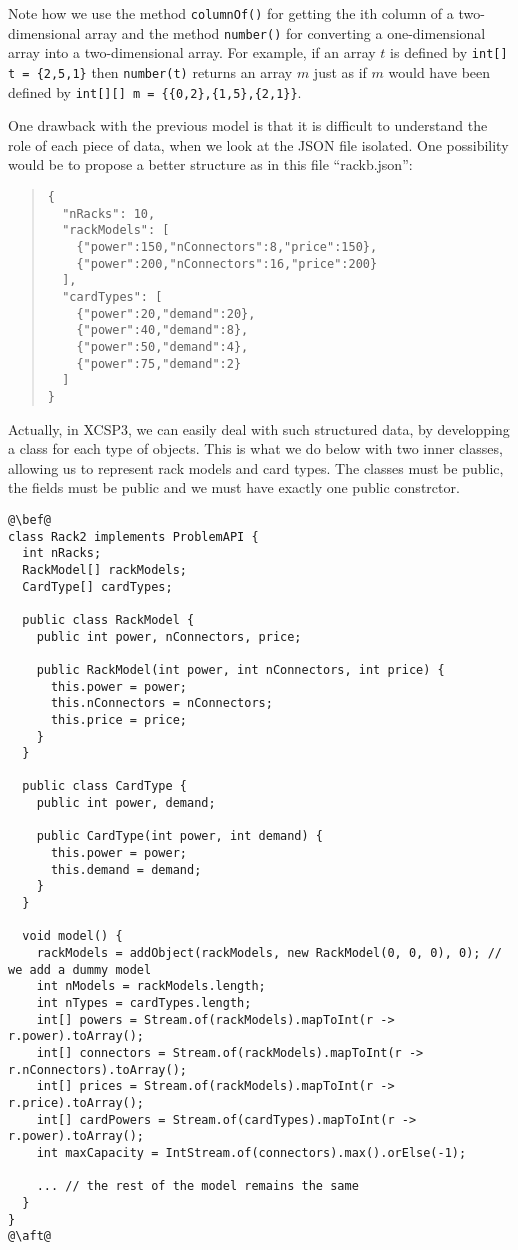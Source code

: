 \documentclass[10pt]{article}
\def\xt{{\rm XCSP3}\xspace}
\newcommand{\nn}[1]{{\tt #1}} %
\def\xt{{\rm XCSP3}\xspace}
\begin{document}
Note how we use the method \nn{columnOf()} for getting the ith column of a two-dimensional array and the method \nn{number()} for converting a one-dimensional array into a two-dimensional array.
For example, if an array $t$ is defined by \verb!int[] t = {2,5,1}! then \verb!number(t)! returns an array $m$ just as if $m$ would have been defined by \verb!int[][] m = {{0,2},{1,5},{2,1}}!.

One drawback with the previous model is that it is difficult to understand the role of each piece of data, when we look at the JSON file isolated.
One possibility would be to propose a better structure as in this file ``rackb.json'':

{\small
\begin{quote}
\begin{verbatim}
{
  "nRacks": 10,
  "rackModels": [
    {"power":150,"nConnectors":8,"price":150},
    {"power":200,"nConnectors":16,"price":200}
  ],
  "cardTypes": [
    {"power":20,"demand":20},
    {"power":40,"demand":8},
    {"power":50,"demand":4},
    {"power":75,"demand":2}
  ]
}
\end{verbatim}
\end{quote}
}


Actually, in \xt, we can easily deal with such structured data, by developping a class for each type of objects.
This is what we do below with two inner classes, allowing us to represent rack models and card types.
The classes must be public, the fields must be public and we must have exactly one public constrctor.


\begin{lstlisting}
@\bef@
class Rack2 implements ProblemAPI {
  int nRacks;
  RackModel[] rackModels;
  CardType[] cardTypes;
  
  public class RackModel {
    public int power, nConnectors, price;
    
    public RackModel(int power, int nConnectors, int price) {
      this.power = power;
      this.nConnectors = nConnectors;
      this.price = price;
    }
  }
  
  public class CardType {
    public int power, demand;
    
    public CardType(int power, int demand) {
      this.power = power;
      this.demand = demand;
    }
  }
  
  void model() {
    rackModels = addObject(rackModels, new RackModel(0, 0, 0), 0); // we add a dummy model 
    int nModels = rackModels.length;
    int nTypes = cardTypes.length;
    int[] powers = Stream.of(rackModels).mapToInt(r -> r.power).toArray();
    int[] connectors = Stream.of(rackModels).mapToInt(r -> r.nConnectors).toArray();
    int[] prices = Stream.of(rackModels).mapToInt(r -> r.price).toArray();
    int[] cardPowers = Stream.of(cardTypes).mapToInt(r -> r.power).toArray();
    int maxCapacity = IntStream.of(connectors).max().orElse(-1);
    
    ... // the rest of the model remains the same
  }
}
@\aft@
\end{lstlisting}
\end{document}
